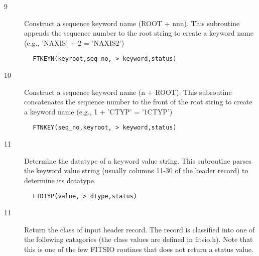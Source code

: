 \documentclass[11pt]{book}
\begin{document}
\begin{description}
\item[9 ] Construct a sequence keyword name (ROOT + nnn).
    This subroutine appends the sequence number to the root string to create
   a keyword name (e.g., 'NAXIS' + 2 = 'NAXIS2')
\end{description}

\begin{verbatim}
        FTKEYN(keyroot,seq_no, > keyword,status)
\end{verbatim}

\begin{description}
\item[10] Construct a sequence keyword name (n + ROOT).
    This subroutine concatenates the sequence number to the front of the
   root string to create a keyword name (e.g., 1 + 'CTYP' = '1CTYP')
\end{description}

\begin{verbatim}
        FTNKEY(seq_no,keyroot, > keyword,status)
\end{verbatim}

\begin{description}
\item[11] Determine the datatype of a keyword value string.
    This subroutine parses the keyword value string (usually columns 11-30
   of the header record) to determine its datatype.
\end{description}

\begin{verbatim}
        FTDTYP(value, > dtype,status)
\end{verbatim}

\begin{description}
\item[11] Return the class of input header record.  The record is classified
    into one of the following catagories (the class values are
    defined in fitsio.h).  Note that this is one of the few FITSIO
   routines that does not return a status value.
\end{description}
\end{document}
